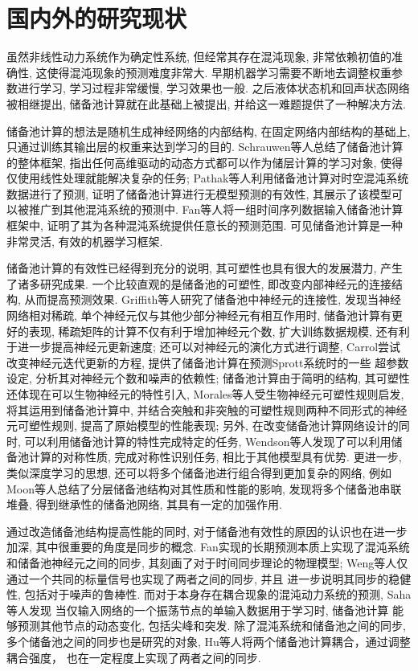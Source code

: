 \documentclass[notitlepage,cs4size,punct,oneside]{ctexrep}
\numberwithin{equation}{chapter}
\theoremstyle{mystyle}
\begin{document}
\section{国内外的研究现状}

虽然非线性动力系统作为确定性系统, 但经常其存在混沌现象, 非常依赖初值的准确性, 
这使得混沌现象的预测难度非常大. 早期机器学习需要不断地去调整权重参数进行学习, 
学习过程非常缓慢, 学习效果也一般. 之后液体状态机\cite{WMTN}和回声状态网络\cite{HJ}
被相继提出, 储备池计算就在此基础上被提出, 并给这一难题提供了一种解决方法. 

储备池计算的想法是随机生成神经网络的内部结构, 在固定网络内部结构的基础上, 
只通过训练其输出层的权重来达到学习的目的. 
Schrauwen等人总结了储备池计算的整体框架, 
指出任何高维驱动的动态方式都可以作为储层计算的学习对象, 
使得仅使用线性处理就能解决复杂的任务\cite{BSDV}; 
Pathak等人利用储备池计算对时空混沌系统数据进行了预测, 
证明了储备池计算进行无模型预测的有效性, 
其展示了该模型可以被推广到其他混沌系统的预测中\cite{JPBH}. 
Fan等人将一组时间序列数据输入储备池计算框架中, 
证明了其为各种混沌系统提供任意长的预测范围\cite{JFJJ}. 
可见储备池计算是一种非常灵活, 有效的机器学习框架. 

储备池计算的有效性已经得到充分的说明, 其可塑性也具有很大的发展潜力, 产生了诸多研究成果. 
一个比较直观的是储备池的可塑性, 即改变内部神经元的连接结构, 从而提高预测效果. 
Griffith等人研究了储备池中神经元的连接性, 发现当神经网络相对稀疏, 
单个神经元仅与其他少部分神经元有相互作用时, 
储备池计算有更好的表现, 
稀疏矩阵的计算不仅有利于增加神经元个数, 扩大训练数据规模, 
还有利于进一步提高神经元更新速度\cite{AGAP}; 
还可以对神经元的演化方式进行调整, 
Carrol尝试改变神经元迭代更新的方程, 提供了储备池计算在预测Sprott系统时的一些
超参数设定, 分析其对神经元个数和噪声的依赖性\cite{TLC}; 
储备池计算由于简明的结构, 其可塑性还体现在可以生物神经元的特性引入, 
Morales等人受生物神经元可塑性规则启发, 将其运用到储备池计算中, 
并结合突触和非突触的可塑性规则两种不同形式的神经元可塑性规则, 
提高了原始模型的性能表现\cite{GBMC}; 
另外, 在改变储备池计算网络设计的同时, 可以利用储备池计算的特性完成特定的任务, 
Wendson等人发现了可以利用储备池计算的对称性质, 完成对称性识别任务, 
相比于其他模型具有优势\cite{WASB}. 
更进一步, 类似深度学习的思想, 还可以将多个储备池进行组合得到更加复杂的网络, 例如 
Moon等人总结了分层储备池结构对其性质和性能的影响, 发现将多个储备池串联堆叠, 
得到继承性的储备池网络, 其具有一定的加强作用\cite{JMYW}. 

通过改造储备池结构提高性能的同时, 对于储备池有效性的原因的认识也在进一步加深, 
其中很重要的角度是同步的概念. Fan实现的长期预测本质上实现了混沌系统和储备池神经元之间的同步, 
其刻画了对于时间同步理论的物理模型\cite{JFJJ}; 
Weng等人仅通过一个共同的标量信号也实现了两者之间的同步\cite{TWHY}, 并且
进一步说明其同步的稳健性, 包括对于噪声的鲁棒性\cite{XCTW}. 
而对于本身存在耦合现象的混沌动力系统的预测, Saha等人发现
当仅输入网络的一个振荡节点的单输入数据用于学习时, 储备池计算
能够预测其他节点的动态变化, 包括尖峰和突发\cite{SSAM}. 
除了混沌系统和储备池之间的同步, 多个储备池之间的同步也是研究的对象, 
Hu等人将两个储备池计算耦合，通过调整耦合强度，
也在一定程度上实现了两者之间的同步\cite{WHYZ}.
\end{document}
